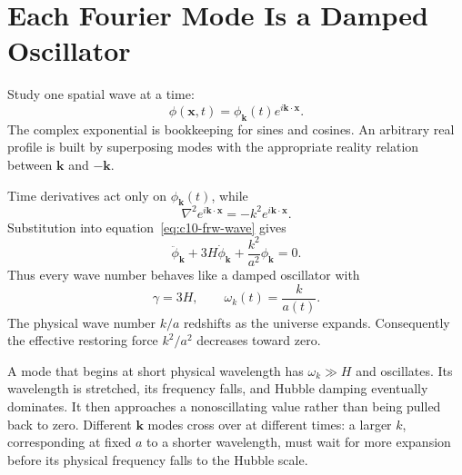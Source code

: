 \begin{classroomqa}
\end{classroomqa}

\section{Each Fourier Mode Is a Damped Oscillator}

Study one spatial wave at a time:
\begin{equation}
\phi(\mathbf x,t)
=\phi_{\mathbf k}(t)e^{i\mathbf k\cdot\mathbf x}.
\label{eq:c10-mode-ansatz}
\end{equation}
The complex exponential is bookkeeping for sines and cosines. An arbitrary real profile is built by superposing modes with the appropriate reality relation between \(\mathbf k\) and \(-\mathbf k\).

Time derivatives act only on \(\phi_{\mathbf k}(t)\), while
\[
\nabla^2e^{i\mathbf k\cdot\mathbf x}
=-k^2e^{i\mathbf k\cdot\mathbf x}.
\]
Substitution into equation~\eqref{eq:c10-frw-wave} gives
\begin{equation}
\ddot\phi_{\mathbf k}
+3H\dot\phi_{\mathbf k}
+\frac{k^2}{a^2}\phi_{\mathbf k}=0.
\label{eq:c10-mode-equation}
\end{equation}
Thus every wave number behaves like a damped oscillator with
\begin{equation}
\gamma=3H,
\qquad
\omega_k(t)=\frac{k}{a(t)}.
\label{eq:c10-mode-identification}
\end{equation}
The physical wave number \(k/a\) redshifts as the universe expands. Consequently the effective restoring force \(k^2/a^2\) decreases toward zero.

A mode that begins at short physical wavelength has \(\omega_k\gg H\) and oscillates. Its wavelength is stretched, its frequency falls, and Hubble damping eventually dominates. It then approaches a nonoscillating value rather than being pulled back to zero. Different \(\mathbf k\) modes cross over at different times: a larger \(k\), corresponding at fixed \(a\) to a shorter wavelength, must wait for more expansion before its physical frequency falls to the Hubble scale.

